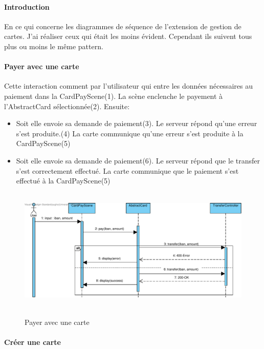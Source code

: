 \documentclass{article}
\begin{document}
\paragraph{Introduction}
En ce qui concerne les diagrammes de séquence de l'extension de gestion de cartes. J'ai réaliser
ceux qui était les moins évident. Cependant ils suivent tous plus ou moins le même pattern.

\paragraph{Payer avec une carte}

Cette interaction comment par l'utilisateur qui entre les données nécessaires au paiement
dans la CardPayScene(1). La scène enclenche le payement à l'AbstractCard sélectionnée(2).
\newline
Ensuite:
\begin{itemize}
    \item Soit elle envoie sa demande de paiement(3). Le serveur répond qu'une erreur s'est produite.(4)
    La carte communique qu'une erreur s'est produite à la CardPayScene(5)
    \item Soit elle envoie sa demande de paiement(6). Le serveur répond que le transfer s'est correctement
        effectué. La carte communique que le paiement s'est effectué à la CardPayScene(5)
\end{itemize}
 


\begin{figure}[h!]
    \hbox{
        \centering\includegraphics[width=\linewidth]{./img/sequence-client-Extension-1_pay.pdf}
    }
    \caption{Payer avec une carte}
\end{figure}

\newpage

\paragraph{Créer une carte}
\end{document}
